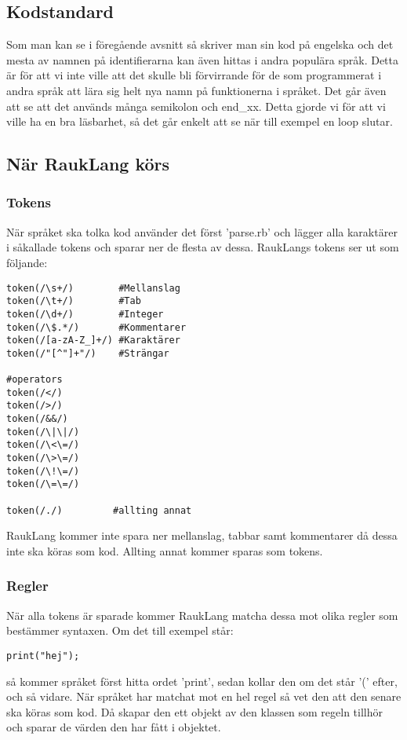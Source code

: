 \documentclass[12pt]{TDP019}
\begin{document}
\subsection{Kodstandard}
Som man kan se i föregående avsnitt så skriver man sin kod på engelska och det mesta av namnen på identifierarna kan även hittas i andra populära språk. Detta är för att vi inte ville att det skulle bli förvirrande för de som programmerat i andra språk att lära sig helt nya namn på funktionerna i språket. Det går även att se att det används många semikolon och end\_xx. Detta gjorde vi för att vi ville ha en bra läsbarhet, så det går enkelt att se när till exempel en loop slutar.

\subsection{När RaukLang körs}
\subsubsection{Tokens}
När språket ska tolka kod använder det först 'parse.rb' och lägger alla karaktärer i såkallade tokens och sparar ner de flesta av dessa. RaukLangs tokens ser ut som följande:

\begin{verbatim}
token(/\s+/)        #Mellanslag
token(/\t+/)        #Tab
token(/\d+/)        #Integer
token(/\$.*/)       #Kommentarer
token(/[a-zA-Z_]+/) #Karaktärer
token(/"[^"]+"/)    #Strängar

#operators
token(/</)
token(/>/)
token(/&&/)
token(/\|\|/)
token(/\<\=/)
token(/\>\=/)
token(/\!\=/)
token(/\=\=/)

token(/./)         #allting annat
\end{verbatim} 
RaukLang kommer inte spara ner mellanslag, tabbar samt kommentarer då dessa inte ska köras som kod. Allting annat kommer sparas som tokens.

\subsubsection{Regler}
När alla tokens är sparade kommer RaukLang matcha dessa mot olika regler som bestämmer syntaxen. Om det till exempel står:
\begin{verbatim}
print("hej");
\end{verbatim}
så kommer språket först hitta ordet 'print', sedan kollar den om det står '(' efter, och så vidare. När språket har matchat mot en hel regel så vet den att den senare ska köras som kod. Då skapar den ett objekt av den klassen som regeln tillhör och sparar de värden den har fått i objektet.
\end{document}
